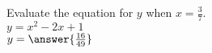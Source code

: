 \documentclass{ximera}
\author{David Kish}
\begin{document}
\begin{exercise}
Evaluate the equation for $y$ when $x=\frac{3}{7}$.\\
$y= x^2- 2x+1$\\
$y= \answer{\frac{16}{49}}$
\end{exercise}
\end{document}
